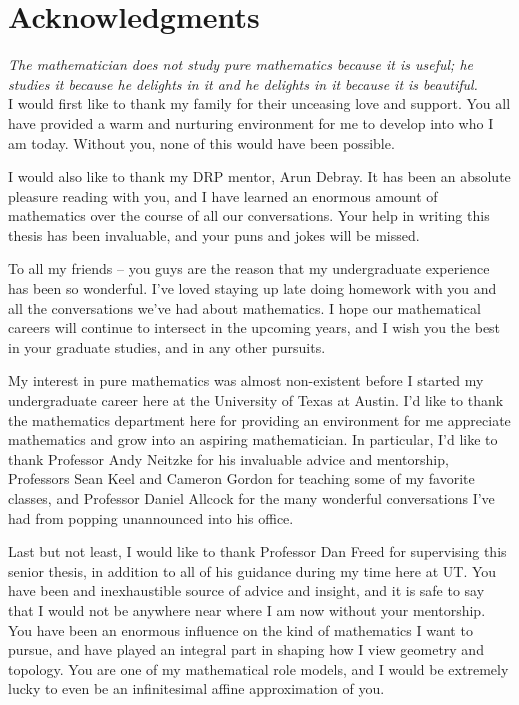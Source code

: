 %
\chapter*{Acknowledgments}
%

%
\subsectionend $ $\\
%
\emph{The mathematician does not study pure mathematics because it is useful;
he studies it because he delights in it and he delights in it because it
is beautiful.} \\
%
%
\subsectionend $ $\\
%

I would first like to thank my family for their unceasing love and support.
You all have provided a warm and nurturing environment for me to develop into
who I am today. Without you, none of this would have been possible.

I would also like to thank my DRP mentor, Arun Debray. It has been an absolute
pleasure reading with you, and I have learned an enormous amount of mathematics
over the course of all our conversations. Your help in writing this thesis
has been invaluable, and your puns and jokes will be missed.

To all my friends -- you guys are the reason that my undergraduate experience
has been so wonderful. I've loved staying up late doing homework with you and
all the conversations we've had about mathematics. I hope our mathematical
careers will continue to intersect in the upcoming years, and I wish you
the best in your graduate studies, and in any other pursuits.

My interest in pure mathematics was almost non-existent before I started my
undergraduate career here at the University of Texas at Austin. I'd like to
thank the mathematics department here for providing an environment for me
appreciate mathematics and grow into an aspiring mathematician. In particular,
I'd like to thank Professor Andy Neitzke for his invaluable advice and mentorship,
Professors Sean Keel and Cameron Gordon for teaching some of my favorite classes,
and Professor Daniel Allcock for the many wonderful conversations I've had
from popping unannounced into his office.

Last but not least, I would like to thank Professor Dan Freed for supervising
this senior thesis, in addition to all of his guidance during my time here at UT.
You have been and inexhaustible source of advice and insight, and it is safe to
say that I would not be anywhere near where I am now without your mentorship.
You have been an enormous influence on the kind of mathematics I want to
pursue, and have played an integral part in shaping how I view geometry
and topology. You are one of my mathematical role models, and I would be extremely
lucky to even be an infinitesimal affine approximation of you.
%